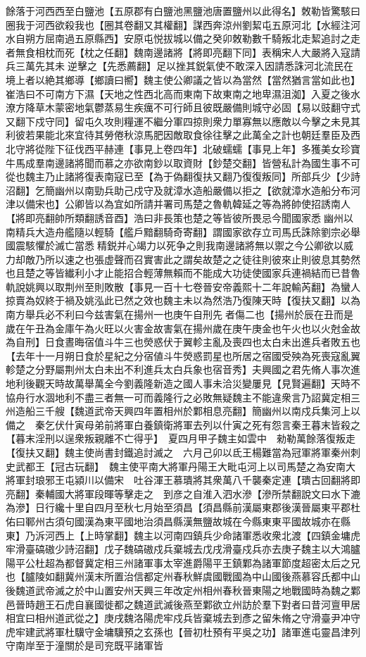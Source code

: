餘落于河西西至白鹽池【五原郡有白鹽池黑鹽池唐置鹽州以此得名】敇勒皆驚駭曰圈我于河西欲殺我也【圈其卷翻又其權翻】謀西奔涼州劉絜屯五原河北【水經注河水自朔方屈南過五原縣西】安原屯悦拔城以備之癸卯敇勒數千騎叛北走絜追討之走者無食相枕而死【枕之任翻】魏南邊諸將【將即亮翻下同】表稱宋人大嚴將入寇請兵三萬先其未逆擊之【先悉薦翻】足以挫其鋭氣使不敢深入因請悉誅河北流民在境上者以絶其鄉導【鄉讀曰嚮】魏主使公卿議之皆以為當然【當然猶言當如此也】崔浩曰不可南方下濕【天地之性西北高而東南下故東南之地卑濕沮洳】入夏之後水潦方降草木蒙密地氣鬱蒸易生疾癘不可行師且彼既嚴備則城守必固【易以豉翻守式又翻下戍守同】留屯久攻則糧運不繼分軍四掠則衆力單寡無以應敵以今擊之未見其利彼若果能北來宜待其勞倦秋涼馬肥因敵取食徐往擊之此萬全之計也朝廷羣臣及西北守將從陛下征伐西平赫連【事見上卷四年】北破蠕蠕【事見上年】多獲美女珍寶牛馬成羣南邊諸將聞而慕之亦欲南鈔以取資財【鈔楚交翻】皆營私計為國生事不可從也魏主乃止諸將復表南寇已至【為于偽翻復扶又翻乃復復叛同】所部兵少【少詩沼翻】乞簡幽州以南勁兵助己戍守及就漳水造船嚴備以拒之【欲就漳水造船分布河津以備宋也】公卿皆以為宜如所請并署司馬楚之魯軌韓延之等為將帥使招誘南人【將即亮翻帥所類翻誘音酉】浩曰非長策也楚之等皆彼所畏忌今聞國家悉幽州以南精兵大造舟艦隨以輕騎【艦戶黯翻騎奇寄翻】謂國家欲存立司馬氏誅除劉宗必舉國震駭懼於滅亡當悉精鋭并心竭力以死争之則我南邊諸將無以禦之今公卿欲以威力却敵乃所以速之也張虚聲而召實害此之謂矣故楚之之徒往則彼來止則彼息其勢然也且楚之等皆纎利小才止能招合輕薄無賴而不能成大功徒使國家兵連禍結而已昔魯軌說姚興以取荆州至則敗散【事見一百十七卷晉安帝義熙十二年說輸芮翻】為蠻人掠賣為奴終于禍及姚泓此已然之效也魏主未以為然浩乃復陳天時【復扶又翻】以為南方舉兵必不利曰今兹害氣在揚州一也庚午自刑先者傷二也【揚州於辰在丑而是歲在午丑為金庫午為火旺以火害金故害氣在揚州歲在庚午庚金也午火也以火尅金故為自刑】日食晝晦宿值斗牛三也熒惑伏于翼軫主亂及喪四也太白未出進兵者敗五也【去年十一月朔日食於星紀之分宿値斗牛熒惑罰星也所居之宿國受殃為死喪寇亂翼軫楚之分野屬荆州太白未出不利進兵太白兵象也宿音秀】夫興國之君先脩人事次進地利後觀天時故萬舉萬全今劉義隆新造之國人事未洽災變屢見【見賢遍翻】天時不協舟行水涸地利不盡三者無一可而義隆行之必敗無疑魏主不能違衆言乃詔冀定相三州造船三千艘【魏道武帝天興四年置相州於鄴相息亮翻】簡幽州以南戍兵集河上以備之　秦乞伏什寅母弟前將軍白養鎮衛將軍去列以什寅之死有怨言秦王暮末皆殺之【暮末淫刑以逞衆叛親離不亡得乎】　夏四月甲子魏主如雲中　勑勒萬餘落復叛走【復扶又翻】魏主使尚書封鐵追討滅之　六月己卯以氐王楊難當為冠軍將軍秦州刺史武都王【冠古玩翻】　魏主使平南大將軍丹陽王大毗屯河上以司馬楚之為安南大將軍封琅邪王屯潁川以備宋　吐谷渾王慕璝將其衆萬八千襲秦定連【璝古回翻將即亮翻】秦輔國大將軍段暉等擊走之　到彦之自淮入泗水滲【滲所禁翻說文曰水下漉為滲】日行纔十里自四月至秋七月始至須昌【須昌縣前漢屬東郡後漢晉屬東平郡杜佑曰鄆州古須句國漢為東平國地治須昌縣漢無鹽故城在今縣東東平國故城亦在縣東】乃泝河西上【上時掌翻】魏主以河南四鎮兵少命諸軍悉收衆北渡【四鎮金墉虎牢滑臺碻磝少詩沼翻】戊子魏碻磝戍兵棄城去戊戌滑臺戍兵亦去庚子魏主以大鴻臚陽平公杜超為都督冀定相三州諸軍事太宰進爵陽平王鎮鄴為諸軍節度超密太后之兄也【臚陵如翻冀州漢末所置治信都定州春秋鮮虞國戰國為中山國後燕慕容氏都中山後魏道武帝滅之於中山置安州天興三年改定州相州春秋晉東陽之地戰國時為魏之鄴邑晉時趙王石虎自襄國徙都之魏道武滅後燕至鄴欲立州訪於羣下對者曰昔河亶甲居相宜曰相州道武從之】庚戌魏洛陽虎牢戍兵皆棄城去到彥之留朱脩之守滑臺尹冲守虎牢建武將軍杜驥守金墉驥預之玄孫也【晉初杜預有平吳之功】諸軍進屯靈昌津列守南岸至于潼關於是司兖既平諸軍皆